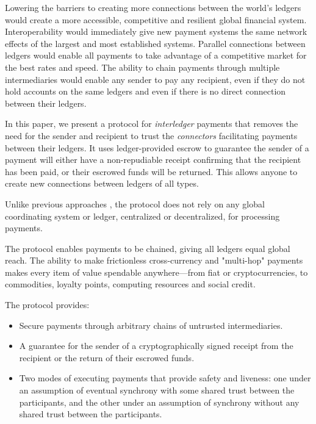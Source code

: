 \documentclass[letterpaper,twocolumn,10pt]{article}
\begin{document}
Lowering the barriers to creating more connections between the world's ledgers would create a more accessible, competitive and resilient global financial system. Interoperability would immediately give new payment systems the same network effects of the largest and most established systems. Parallel connections between ledgers would enable all payments to take advantage of a competitive market for the best rates and speed. The ability to chain payments through multiple intermediaries would enable any sender to pay any recipient, even if they do not hold accounts on the same ledgers and even if there is no direct connection between their ledgers.

In this paper, we present a protocol for \mbox{\textit{interledger}} payments that removes the need for the sender and recipient to trust the \textit{connectors} facilitating payments between their ledgers. It uses ledger-provided escrow to guarantee the sender of a payment will either have a non-repudiable receipt confirming that the recipient has been paid, or their escrowed funds will be returned. This allows anyone to create new connections between ledgers of all types.

Unlike previous approaches \cite{davies1989security} \cite{Bitcoin}\cite{schwartz2014ripple}\cite{wood2014ethereum}\cite{mazieresstellar}\cite{back2014enabling}\cite{poonbitcoin}, the protocol does not rely on any global coordinating system or ledger, centralized or decentralized, for processing payments.

The protocol enables payments to be chained, giving all ledgers equal global reach. The ability to make frictionless cross-currency and "multi-hop" payments makes every item of value spendable anywhere---from fiat or cryptocurrencies, to commodities, loyalty points, computing resources and social credit.

The protocol provides:
\begin{itemize}
\item Secure payments through arbitrary chains of untrusted intermediaries.
\item A guarantee for the sender of a cryptographically signed receipt from the recipient or the return of their escrowed funds.
\item Two modes of executing payments that provide safety and liveness: one under an assumption of eventual synchrony with some shared trust between the participants, and the other under an assumption of synchrony without any shared trust between the participants.
\end{itemize}
\end{document}

